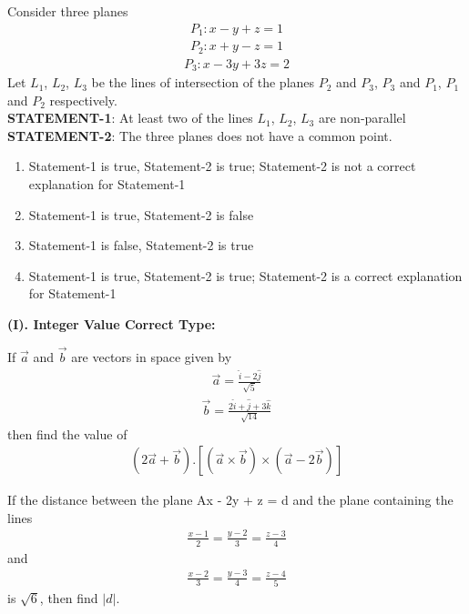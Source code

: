 \item Consider three planes
\begin{align*}
P_1: x - y + z = 1
\end{align*}
\begin{align*}
P_2: x + y - z = 1
\end{align*}
\begin{align*}
P_3: x - 3y + 3z = 2
\end{align*}
Let $L_1$, $L_2$, $L_3$ be the lines of intersection of the planes $P_2$ and $P_3$, $P_3$ and $P_1$, $P_1$ and $P_2$ respectively.\\
\textbf{STATEMENT-1}: At least two of the lines $L_1$, $L_2$, $L_3$ are non-parallel\\
\textbf{STATEMENT-2}: The three planes does not have a common point.
\begin{enumerate}
\item Statement-1 is true, Statement-2 is true; Statement-2 is not a correct explanation for Statement-1
\item Statement-1 is true, Statement-2 is false
\item Statement-1 is false, Statement-2 is true
\item Statement-1 is true, Statement-2 is true; Statement-2 is a correct explanation for Statement-1
\end{enumerate}
 
\textbf{(I). Integer Value Correct Type:}

\item If $\overrightarrow{a}$ and $\overrightarrow{b}$ are vectors in space given by 
\begin{align*}
\overrightarrow{a} = \frac{\hat{i} - 2\hat{j}}{\sqrt{5}}
\end{align*}
\begin{align*}
\overrightarrow{b} = \frac{2\hat{i} + \hat{j} + 3\hat{k}}{\sqrt{14}}
\end{align*}
then find the value of 
\begin{align*}
(2\overrightarrow{a} + \overrightarrow{b}).[(\overrightarrow{a} \times \overrightarrow{b}) \times (\overrightarrow{a} - 2\overrightarrow{b})]
\end{align*}

\item If the distance between the plane Ax - 2y + z = d and the plane containing the lines
\begin{align*}
\frac{x-1}{2} = \frac{y-2}{3} = \frac{z-3}{4}
\end{align*}
and
\begin{align*}
\frac{x-2}{3} = \frac{y-3}{4} = \frac{z-4}{5}
\end{align*}
is $\sqrt{6}$, then find $|d|$.

